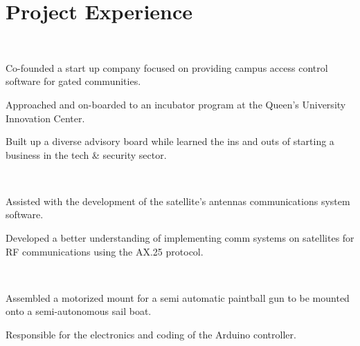 \documentclass[]{hieudo-build}
\begin{document}
\hfill
\begin{minipage}[t]{0.69\textwidth} 

\section{Project Experience}

 \\
\vspace{\topsep} %
\begin{tightemize}
\item Co-founded a start up company focused on providing campus access control software for gated communities.
\item Approached and on-boarded to an incubator program at the Queen's University Innovation Center.
\item Built up a diverse advisory board while learned the ins and outs of starting a business in the tech \& security sector.
\end{tightemize}
\sectionsep

\\
\begin{tightemize}
\item Assisted with the development of the satellite's antennas communications system software.
\item Developed a better understanding of implementing comm systems on satellites for RF communications using the AX.25 protocol.
\end{tightemize}
\sectionsep

 \\
\begin{tightemize}
\item Assembled a motorized mount for a semi automatic paintball gun to be mounted onto a semi-autonomous sail boat.
\item Responsible for the electronics and coding of the Arduino controller.
\end{tightemize}
\sectionsep


\end{minipage}
\end{document}
